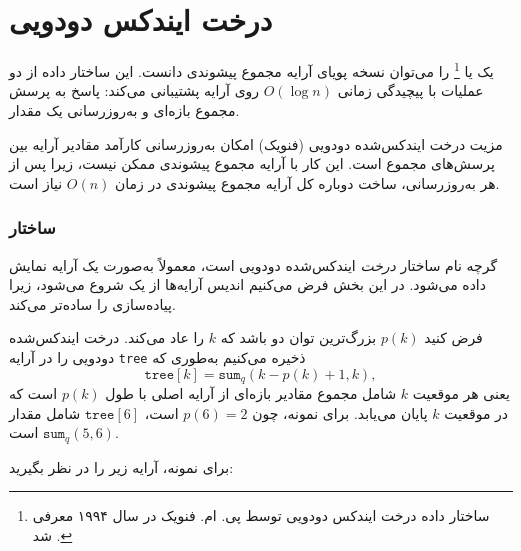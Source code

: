 \section{درخت ایندکس دودویی}


یک  یا \footnote{ساختار داده درخت ایندکس دودویی توسط پی. ام. فنویک در سال ۱۹۹۴ معرفی شد \cite{fen94}.}
را می‌توان نسخه پویای آرایه مجموع پیشوندی دانست.
این ساختار داده از دو عملیات با پیچیدگی زمانی $O(\log n)$ روی آرایه پشتیبانی می‌کند:
پاسخ به پرسش مجموع بازه‌ای و به‌روزرسانی یک مقدار.

مزیت درخت ایندکس‌شده دودویی (فنویک)
امکان به‌روزرسانی کارآمد مقادیر آرایه
بین پرسش‌های مجموع است.
این کار با آرایه مجموع پیشوندی ممکن نیست،
زیرا پس از هر به‌روزرسانی، ساخت دوباره کل آرایه
مجموع پیشوندی در زمان $O(n)$ نیاز است.

\subsubsection{ساختار}

گرچه نام ساختار \emph{درخت} ایندکس‌شده دودویی است،
معمولاً به‌صورت یک آرایه نمایش داده می‌شود.
در این بخش فرض می‌کنیم اندیس آرایه‌ها از یک شروع می‌شود،
زیرا پیاده‌سازی را ساده‌تر می‌کند.

فرض کنید $p(k)$ بزرگ‌ترین توان دو باشد که
$k$ را عاد می‌کند.
درخت ایندکس‌شده دودویی را در آرایه \texttt{tree} ذخیره می‌کنیم
به‌طوری که
\[ \texttt{tree}[k] = \texttt{sum}_q(k-p(k)+1,k),\]
یعنی هر موقعیت $k$ شامل مجموع مقادیر بازه‌ای
از آرایه اصلی با طول $p(k)$ است
که در موقعیت $k$ پایان می‌یابد.
برای نمونه، چون $p(6)=2$ است، $\texttt{tree}[6]$
شامل مقدار $\texttt{sum}_q(5,6)$ است.

برای نمونه، آرایه زیر را در نظر بگیرید:
\begin{center}
\end{center}

